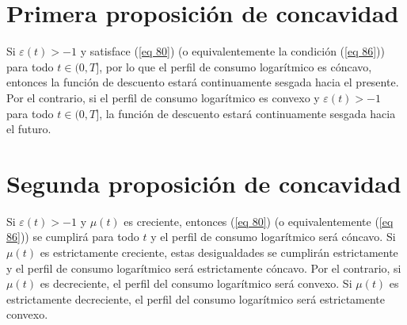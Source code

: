 
\section{Primera proposición de concavidad }
\begin{prop}\label{prop 6}
Si $\varepsilon(t) > -1 $ y satisface (\ref{eq 80}) (o equivalentemente la condición (\ref{eq 86})) para todo $t \in (0, T]$, por lo que el perfil de consumo logarítmico es cóncavo, entonces la función de descuento estará continuamente sesgada hacia el presente. Por el contrario, si el perfil de consumo logarítmico es convexo y $\varepsilon(t) > -1 $ para todo $t \in (0, T]$, la función de descuento estará continuamente sesgada hacia el futuro.
\end{prop}

\section{Segunda proposición de concavidad }
\begin{prop}\label{prop 7} Si $\varepsilon(t) > -1$ y $\mu(t)$ es creciente, entonces (\ref{eq 80}) (o equivalentemente (\ref{eq 86})) se cumplirá para todo $t$ y el perfil de consumo logarítmico será cóncavo. Si $\mu(t)$ es estrictamente creciente, estas desigualdades se cumplirán estrictamente y el perfil de consumo logarítmico será estrictamente cóncavo. Por el contrario, si $\mu(t)$ es decreciente, el perfil del consumo logarítmico será convexo. Si $\mu(t)$ es estrictamente decreciente, el perfil del consumo logarítmico será estrictamente convexo.  \end{prop}

